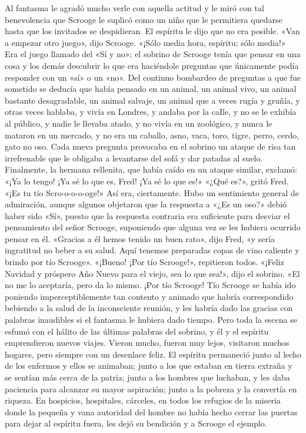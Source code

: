 \documentclass{novela}
\begin{document}
 Al fantasma le agradó mucho verle con aquella actitud y le miró con tal benevolencia que Scrooge le suplicó como un niño que le permitiera quedarse hasta que los invitados se despidieran. El espíritu le dijo que no era posible.
 «Van a empezar otro juego», dijo Scrooge. «¡Sólo media hora, espíritu; sólo media!»
 Era el juego llamado del «Sí y no»; el sobrino de Scrooge tenía que pensar en una cosa y los demás descubrir lo que era haciéndole preguntas que únicamente podía responder con un «sí» o un «no». Del continuo bombardeo de preguntas a que fue sometido se deducía que había pensado en un animal, un animal vivo, un animal bastante desagradable, un animal salvaje, un animal que a veces rugía y gruñía, y otras veces hablaba, y vivía en Londres, y andaba por la caIle, y no se le exhibía al público, y nadie le llevaba atado, y no vivía en un zoológico, y nunca le mataron en un mercado, y no era un caballo, asno, vaca, toro, tigre, perro, cerdo, gato no oso. Cada nueva pregunta provocaba en el sobrino un ataque de risa tan irrefrenable que le obligaba a levantarse del sofá y dar patadas al suelo. Finalmente, la hermana rellenita, que había caído en un ataque similar, exclamó: «¡Ya lo tengo! ¡Ya sé lo que es, Fred! ¡Ya sé lo que es!»
 «¿Qué es?», gritó Fred.
 «¡Es tu tío Scro-o-o-o-oge!»
 Así era, ciertamente. Hubo un sentimiento general de admiración, aunque algunos objetaron que la respuesta a «¿Es un oso?» debió haber sido «Sí», puesto que la respuesta contraria era suficiente para desviar el pensamiento del señor Scrooge, suponiendo que alguna vez se les hubiera ocurrido pensar en él.
 «Gracias a él hemos tenido un buen rato», dijo Fred, «y sería ingratitud no beber a su salud. Aquí tenemos preparadas copas de vino caliente y brindo por tío Scrooge».
 «¡Bueno! ¡Por tío Scrooge!», repitieron todos.
 «¡Feliz Navidad y próspero Año Nuevo para el viejo, sea lo que sea!», dijo el sobrino. «El no me lo aceptaría, pero da lo mismo. ¡Por tío Scrooge!
 Tío Scrooge se había ido poniendo imperceptiblemente tan contento y animado que habría correspondido bebiendo a la salud de la inconsciente reunión, y les habría dado las gracias con palabras inaudibles si el fantasma le hubiera dado tiempo. Pero toda la escena se esfumó con el hálito de las últimas palabras del sobrino, y él y el espíritu emprendieron nuevos viajes.
 Vieron mucho, fueron muy lejos, visitaron muchos hogares, pero siempre con un desenlace feliz. El espíritu permaneció junto al lecho de los enfermos y ellos se animaban; junto a los que estaban en tierra extraña y se sentían más cerca de la patria; junto a los hombres que luchaban, y les daba paciencia para alcanzar su mayor aspiración; junto a la pobreza y la convertía en riqueza. En hospicios, hospitales, cárceles, en todos los refugios de la miseria donde la pequeña y vana autoridad del hombre no había hecho cerrar las puertas para dejar al espíritu fuera, les dejó su bendición y a Scrooge el ejemplo.
\end{document}
